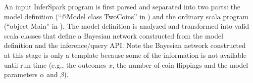 An input InferSpark program is first parsed and separated into two parts: the
model definition (``{\sf @Model} class TwoCoins'' in
) and the ordinary scala program (``{\sf object
Main}'' in ). The model definition is analyzed
and transformed into valid scala classes that define a Bayesian network
constructed from the model definition and the inference/query API.  Note the
Bayesian network constructed at this stage is only a template because some of
the information is not available until run time (e.g., the outcomes $x$, the
number of coin flippings and the model parameters $\alpha$ and $\beta$). 
%
%
%


